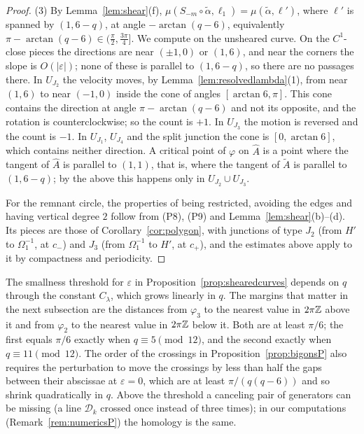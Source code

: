 \begin{proof}
(3) By Lemma~\ref{lem:shear}(f), $\mu(S_{-m}\circ\tilde\alpha,\ell_1)=\mu(\tilde\alpha,\ell')$, where $\ell'$ is spanned by $(1,6-q)$, at angle
$-\arctan(q-6)$, equivalently $\pi-\arctan(q-6)\in(\frac\pi2,\frac{3\pi}4]$. We compute on the unsheared curve. On the
$C^1$-close pieces the directions are near $(\pm1,0)$ or $(1,6)$, and near the corners the slope is $O(|\varepsilon|)$; none of these
is parallel to $(1,6-q)$, so there are no passages there. In $U_{J_2}$ the velocity moves, by Lemma~\ref{lem:resolvedlambda}(1),
from near $(1,6)$ to near $(-1,0)$ inside the cone of angles $[\arctan6,\pi]$. This cone contains the direction at angle
$\pi-\arctan(q-6)$ and not its opposite, and the rotation is counterclockwise; so the count is $+1$. In $U_{J_3}$ the
motion is reversed and the count is $-1$. In $U_{J_1}$, $U_{J_4}$ and the split junction the cone is $[0,\arctan6]$, which
contains neither direction. A critical point of $\varphi$ on $\hat A$ is a point where the tangent of $\hat A$ is parallel to
$(1,1)$, that is, where the tangent of $\tilde A$ is parallel to $(1,6-q)$; by the above this happens only in
$U_{J_2}\cup U_{J_3}$.

For the remnant circle, the properties of being restricted, avoiding the edges and having vertical degree $2$ follow from (P8), (P9) and
Lemma~\ref{lem:shear}(b)--(d). Its pieces are those of Corollary~\ref{cor:polygon}, with junctions of type $J_2$ (from $H'$
to $\Omega_1^{-1}$, at $c_-$) and $J_3$ (from $\Omega_1^{-1}$ to $H'$, at $c_+$), and the estimates above apply to it by compactness and
periodicity.
\end{proof}

\begin{remark}\label{rem:threshold}
The smallness threshold for $\varepsilon$ in Proposition~\ref{prop:shearedcurves} depends on $q$ through the constant $C_\lambda$, which
grows linearly in $q$. The margins that matter in the next subsection are the distances from $\varphi_3$ to the nearest
value in $2\pi\mathbb{Z}$ above it and from $\varphi_2$ to the nearest value in $2\pi\mathbb{Z}$ below it. Both are at least $\pi/6$; the first
equals $\pi/6$ exactly when $q\equiv5\pmod{12}$, and the second exactly when $q\equiv11\pmod{12}$. The order of the
crossings in Proposition~\ref{prop:bigonsP} also requires the perturbation to move the crossings by less than half the gaps
between their abscissae at $\varepsilon=0$, which are at least $\pi/(q(q-6))$ and so shrink quadratically in $q$. Above the
threshold a canceling pair of generators can be missing (a line $\mathcal D_k$ crossed once instead of three times); in our
computations (Remark~\ref{rem:numericsP}) the homology is the same.
\end{remark}

